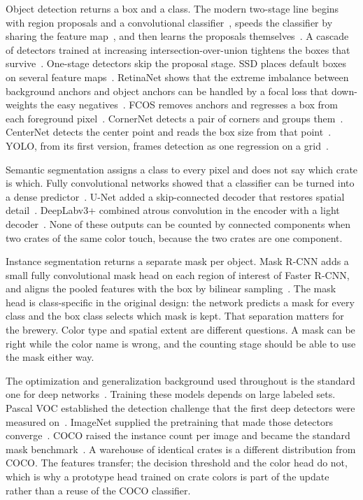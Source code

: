 Object detection returns a box and a class. The modern two-stage line begins with region proposals and a convolutional classifier~\cite{girshick2014rcnn}, speeds the classifier by sharing the feature map~\cite{girshick2015fastrcnn}, and then learns the proposals themselves~\cite{ren2015faster}. A cascade of detectors trained at increasing intersection-over-union tightens the boxes that survive~\cite{cai2018cascade}. One-stage detectors skip the proposal stage. SSD places default boxes on several feature maps~\cite{liu2016ssd}. RetinaNet shows that the extreme imbalance between background anchors and object anchors can be handled by a focal loss that down-weights the easy negatives~\cite{lin2017focal}. FCOS removes anchors and regresses a box from each foreground pixel~\cite{tian2019fcos}. CornerNet detects a pair of corners and groups them~\cite{law2018cornernet}. CenterNet detects the center point and reads the box size from that point~\cite{zhou2019centernet}. YOLO, from its first version, frames detection as one regression on a grid~\cite{redmon2016yolo}.

Semantic segmentation assigns a class to every pixel and does not say which crate is which. Fully convolutional networks showed that a classifier can be turned into a dense predictor~\cite{long2015fcn}. U-Net added a skip-connected decoder that restores spatial detail~\cite{ronneberger2015unet}. DeepLabv3+ combined atrous convolution in the encoder with a light decoder~\cite{chen2018deeplab}. None of these outputs can be counted by connected components when two crates of the same color touch, because the two crates are one component.

Instance segmentation returns a separate mask per object. Mask R-CNN adds a small fully convolutional mask head on each region of interest of Faster R-CNN, and aligns the pooled features with the box by bilinear sampling~\cite{he2017maskrcnn}. The mask head is class-specific in the original design: the network predicts a mask for every class and the box class selects which mask is kept. That separation matters for the brewery. Color type and spatial extent are different questions. A mask can be right while the color name is wrong, and the counting stage should be able to use the mask either way.

The optimization and generalization background used throughout is the standard one for deep networks~\cite{goodfellow2016dl,lecun2015nature}. Training these models depends on large labeled sets. Pascal VOC established the detection challenge that the first deep detectors were measured on~\cite{everingham2010pascal}. ImageNet supplied the pretraining that made those detectors converge~\cite{deng2009imagenet}. COCO raised the instance count per image and became the standard mask benchmark~\cite{lin2014coco}. A warehouse of identical crates is a different distribution from COCO. The features transfer; the decision threshold and the color head do not, which is why a prototype head trained on crate colors is part of the update rather than a reuse of the COCO classifier.

